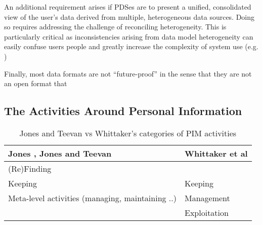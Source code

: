 \documentclass[runningheads,a4paper]{llncs}
\begin{document}
An additional requirement arises if PDSes are to present a unified, consolidated view of the user's data derived from multiple, heterogeneous data sources. Doing so requires addressing the challenge of reconciling heterogeneity.  This is particularly critical as inconsistencies arising from data model heterogeneity can easily confuse users people and greatly increase the complexity of system use (e.g. \cite{})

Finally, most data formats are not ``future-proof'' in the sense that they are not an open format that 




\subsection{The Activities Around Personal Information}

\begin{table}
\begin{tabular}{p{5cm} p{7cm}} 
Jones \cite{jones}, Jones and Teevan \cite{jonesteevan}& Whittaker et al \cite{whittaker}\\
\hline
(Re)Finding &  \\
Keeping & Keeping \\
Meta-level activities (managing, maintaining ..) & Management \\
 & Exploitation \\
\end{tabular}
\caption{Jones and Teevan vs Whittaker's categories of PIM activities}
\label{fig:pimactivities}
\end{table}



\end{document}
